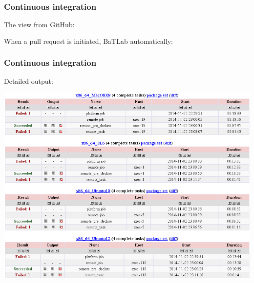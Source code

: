 \documentclass[12pt]{beamer}
\begin{document}
\begin{frame}
\frametitle{Continuous integration}

The view from GitHub:

When a pull request is initiated, BaTLab automatically:
\begin{enumerate}
\end{enumerate}

\end{frame}
\begin{frame}
\frametitle{Continuous integration}

Detailed output:
\centerline{\includegraphics[height=0.8\textheight]{figures/CI_detail.png}}

\end{frame}
\end{document}
